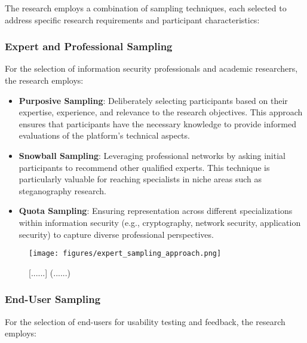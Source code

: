 \documentclass[12pt, a4paper, oneside]{book}
\begin{document}
The research employs a combination of sampling techniques, each selected to address specific research requirements and participant characteristics:

\subsubsection{Expert and Professional Sampling}
For the selection of information security professionals and academic researchers, the research employs:

\begin{itemize}[leftmargin=*]
    \item \textbf{Purposive Sampling}: Deliberately selecting participants based on their expertise, experience, and relevance to the research objectives. This approach ensures that participants have the necessary knowledge to provide informed evaluations of the platform's technical aspects.

    \item \textbf{Snowball Sampling}: Leveraging professional networks by asking initial participants to recommend other qualified experts. This technique is particularly valuable for reaching specialists in niche areas such as steganography research.

    \item \textbf{Quota Sampling}: Ensuring representation across different specializations within information security (e.g., cryptography, network security, application security) to capture diverse professional perspectives.
\end{itemize}

\begin{figure}[htbp]
    \centering
    \texttt{[image: figures/expert\_sampling\_approach.png]}
    \caption{[......] (......)}
    \label{fig:expert_sampling}
\end{figure}

\subsubsection{End-User Sampling}
For the selection of end-users for usability testing and feedback, the research employs:
\end{document}
